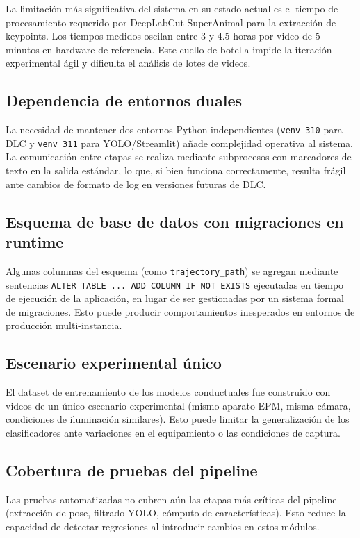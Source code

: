 \documentclass[12pt]{report}
\begin{document}
La limitación más significativa del sistema en su estado actual es el tiempo
de procesamiento requerido por DeepLabCut SuperAnimal para la extracción de
keypoints. Los tiempos medidos oscilan entre 3 y 4.5 horas por video de 5
minutos en hardware de referencia. Este cuello de botella impide la iteración
experimental ágil y dificulta el análisis de lotes de videos.

\subsection{Dependencia de entornos duales}

La necesidad de mantener dos entornos Python independientes (\texttt{venv\_310}
para DLC y \texttt{venv\_311} para YOLO/Streamlit) añade complejidad operativa
al sistema. La comunicación entre etapas se realiza mediante subprocesos con
marcadores de texto en la salida estándar, lo que, si bien funciona correctamente,
resulta frágil ante cambios de formato de log en versiones futuras de DLC.

\subsection{Esquema de base de datos con migraciones en runtime}

Algunas columnas del esquema (como \texttt{trajectory\_path}) se agregan
mediante sentencias \texttt{ALTER TABLE ... ADD COLUMN IF NOT EXISTS} ejecutadas
en tiempo de ejecución de la aplicación, en lugar de ser gestionadas por un
sistema formal de migraciones. Esto puede producir comportamientos inesperados
en entornos de producción multi-instancia.

\subsection{Escenario experimental único}

El dataset de entrenamiento de los modelos conductuales fue construido con
videos de un único escenario experimental (mismo aparato EPM, misma cámara,
condiciones de iluminación similares). Esto puede limitar la generalización
de los clasificadores ante variaciones en el equipamiento o las condiciones
de captura.

\subsection{Cobertura de pruebas del pipeline}

Las pruebas automatizadas no cubren aún las etapas más críticas del pipeline
(extracción de pose, filtrado YOLO, cómputo de características). Esto reduce
la capacidad de detectar regresiones al introducir cambios en estos módulos.
\end{document}
